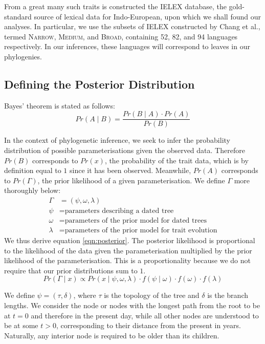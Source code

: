 \documentclass[10pt,journal,compsoc]{IEEEtran}
\begin{document}
From a great many such traits is constructed the IELEX database, the gold-standard source of lexical data for Indo-European, upon which we shall found our analyses. In particular, we use the subsets of IELEX constructed by Chang et al., termed \textsc{Narrow}, \textsc{Medium}, and \textsc{Broad}, containing 52, 82, and 94 languages respectively. In our inferences, these languages will correspond to leaves in our phylogenies.

\subsection{Defining the Posterior Distribution}

Bayes' theorem is stated as follows:
\begin{equation}
    Pr(A\;|\;B) = \frac{Pr(B\;|\;A) \cdot Pr(A)}{Pr(B)}
\end{equation}

In the context of phylogenetic inference, we seek to infer the probability distribution of possible parameterisations given the observed data. Therefore $Pr(B)$ corresponds to $Pr(x)$, the probability of the trait data, which is by definition equal to $1$ since it has been observed. Meanwhile, $Pr(A)$ corresponds to $Pr(\Gamma)$, the prior likelihood of a given parameterisation. We define $\Gamma$ more thoroughly below:
\begin{align*}
    \Gamma &= (\psi, \omega, \lambda)\\
    \psi   &= \text{parameters describing a dated tree}\\
    \omega &= \text{parameters of the prior model for dated trees}\\
    \lambda&= \text{parameters of the prior model for trait evolution}
\end{align*}
We thus derive equation \eqref{eqn:posterior}. The posterior likelihood is proportional to the likelihood of the data given the parameterisation multiplied by the prior likelihood of the parameterisation. This is a proportionality because we do not require that our prior distributions sum to $1$.
\begin{equation}\label{eqn:posterior}
    Pr(\Gamma\;|\; x) \propto Pr(x\;|\;\psi, \omega, \lambda) \cdot f(\psi\;|\;\omega) \cdot f(\omega) \cdot f(\lambda)
\end{equation}

We define $\psi = (\tau, \delta)$, where $\tau$ is the topology of the tree and $\delta$ is the branch lengths. We consider the node or nodes with the longest path from the root to be at $t = 0$ and therefore in the present day, while all other nodes are understood to be at some $t > 0$, corresponding to their distance from the present in years. Naturally, any interior node is required to be older than its children.
\end{document}
